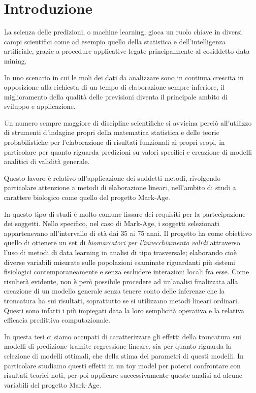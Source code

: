 \documentclass[12pt,openright,twoside,a4paper]{book}
\begin{document}
\frontmatter

\tableofcontents

\chapter{Introduzione}
La scienza delle predizioni, o machine learning, gioca un ruolo chiave in diversi campi scientifici come ad esempio quello della statistica e dell'intelligenza artificiale, grazie a procedure applicative legate principalmente al cosiddetto data mining.

In uno scenario in cui le moli dei dati da analizzare sono in continua crescita in opposizione alla richiesta di un tempo di elaborazione sempre inferiore, il miglioramento della qualità delle previsioni diventa il principale ambito di sviluppo e applicazione.

Un numero sempre maggiore di discipline scientifiche si avvicina perciò all'utilizzo di strumenti d'indagine propri della matematica statistica e delle teorie probabilistiche per l'elaborazione di risultati funzionali ai propri scopi, in particolare per quanto riguarda predizioni su valori specifici e creazione di modelli analitici di validità generale.

Questo lavoro è relativo all'applicazione dei suddetti metodi, rivolgendo particolare attenzione a metodi di elaborazione lineari, nell'ambito di studi a carattere biologico come quello del progetto Mark-Age.

In questo tipo di studi è molto comune fissare dei requisiti per la partecipazione dei soggetti.
Nello specifico, nel caso di Mark-Age, i soggetti selezionati appartenevano all'intervallo di età dai 35 ai 75 anni.
Il progetto ha come obiettivo quello di ottenere un set di \textit{biomarcatori per l'invecchiamento validi} attraverso l'uso di metodi di data learning in analisi di tipo trasversale; elaborando cioè diverse variabili misurate sulle popolazioni esaminate riguardanti più sistemi fisiologici contemporaneamente e senza escludere interazioni locali fra esse.
Come risulterà evidente, non è però possibile procedere ad un'analisi finalizzata alla creazione di un modello generale senza tenere conto delle inferenze che la troncatura ha sui risultati, soprattutto se si utilizzano metodi lineari ordinari. Questi sono infatti i più impiegati data la loro semplicità operativa e la relativa efficacia predittiva computazionale.

In questa tesi ci siamo occupati di caratterizzare gli effetti della troncatura sui modelli di predizione tramite regressione lineare, sia per quanto riguarda la selezione di modelli ottimali, che della stima dei parametri di questi modelli.
In particolare studiamo questi effetti in un toy model per poterci confrontare con risultati teorici noti, per poi applicare successivamente queste analisi ad alcune variabili del progetto Mark-Age.
\end{document}
